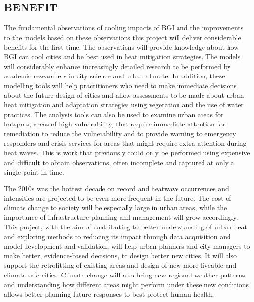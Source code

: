 \subsection*{\TitleFont BENEFIT}


The fundamental observations of cooling impacts of BGI and the improvements to the models based on these observations this project will deliver considerable benefits for the first time. The observations will provide knowledge about how BGI can cool cities and be best used in heat mitigation strategies. The models will considerably enhance increasingly detailed research to be performed by academic researchers in city science and urban climate. In addition, these modelling tools will help practitioners who need to make immediate decisions about the future design of cities and allow assessments to be made about urban heat mitigation and adaptation strategies using vegetation and the use of water practices. The analysis tools can also be used to examine urban areas for hotspots, areas of high vulnerability, that require immediate attention for remediation to reduce the vulnerability and to provide warning to emergency responders and crisis services for areas that might require extra attention during heat waves. This is work that previously could only be performed using expensive and difficult to obtain observations, often incomplete and captured at only a single point in time.

The 2010s was the hottest decade on record and heatwave occurrences and intensities are projected to be even more frequent in the future. The cost of climate change to society will be especially large in urban areas, while the importance of infrastructure planning and management will grow accordingly. This project, with the aim of contributing to better understanding of urban heat and exploring methods to reducing its impact through data acquisition and model development and validation, will help urban planners and city managers to make better, evidence-based decisions, to design better new cities. It will also support the retrofitting of existing areas and design of new more liveable and climate-safe cities. Climate change will also bring new regional weather patterns and understanding how different areas might perform under these new conditions allows better planning future responses to best protect human health.


